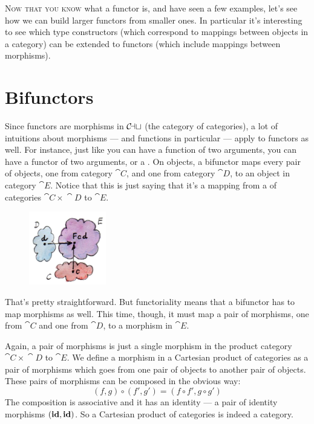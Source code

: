 
\lettrine[lhang=0.17]{N}{ow that you know} what a functor is, and have seen a few examples, let's
see how we can build larger functors from smaller ones. In particular
it's interesting to see which type constructors (which correspond to
mappings between objects in a category) can be extended to functors
(which include mappings between morphisms).

\section{Bifunctors}

Since functors are morphisms in $\mathcal{C\mkern-3mu at}$ (the category of categories),
a lot of intuitions about morphisms --- and functions in particular ---
apply to functors as well. For instance, just like you can have a
function of two arguments, you can have a functor of two arguments, or a
. On objects, a bifunctor maps every pair of objects,
one from category $\cat{C}$, and one from category $\cat{D}$, to an object in category
$\cat{E}$. Notice that this is just saying that it's a mapping from a
 of categories $\cat{C}\times{}\cat{D}$ to $\cat{E}$.

\begin{figure}[H]
\centering\includegraphics[width=0.3\textwidth]{images/bifunctor.jpg}
\end{figure}

\noindent
That's pretty straightforward. But functoriality means that a bifunctor
has to map morphisms as well. This time, though, it must map a pair of
morphisms, one from $\cat{C}$ and one from $\cat{D}$, to a morphism in $\cat{E}$.

Again, a pair of morphisms is just a single morphism in the product
category $\cat{C}\times{}\cat{D}$ to $\cat{E}$. We define a morphism in a Cartesian product of categories
as a pair of morphisms which goes from one pair of objects to another
pair of objects. These pairs of morphisms can be composed in the obvious
way:
\[(f, g) \circ (f', g') = (f \circ f', g \circ g')\]
The composition is associative and it has an identity --- a pair of
identity morphisms $(\mathbf{id}, \mathbf{id})$. So a Cartesian product of categories
is indeed a category.

